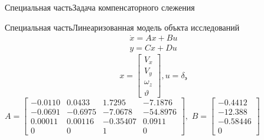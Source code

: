 
\begin{frame}{Специальная часть}{Задача компенсаторного слежения}
\end{frame}
\begin{frame}{Специальная часть}{Линеаризованная модель объкта исследований}
    \begin{equation} \begin{aligned} \dot{x} = Ax+Bu \\ 
    y = Cx + Du \end{aligned} \end{equation}
$$x = \begin{bmatrix}
        V_x\\ 
        V_y\\ 
        \omega_z\\ 
        \vartheta
    \end{bmatrix},
u = \delta_\text{э}$$
   $ A = \begin{bmatrix}
        -0.0110 & 0.0433 & 1.7295 & -7.1876\\ 
        -0.0691 & -0.6975 & -7.0678 & -54.8976\\ 
        0.00011 & 0.00116 & -0.35407 & 0.0911\\ 
        0 & 0 & 1 & 0
    \end{bmatrix} ,$  
        $B = \begin{bmatrix}
        -0.4412\\ 
        -12.388\\ 
        -0.58446 \\ 
        0
    \end{bmatrix}$  
\end{frame}


